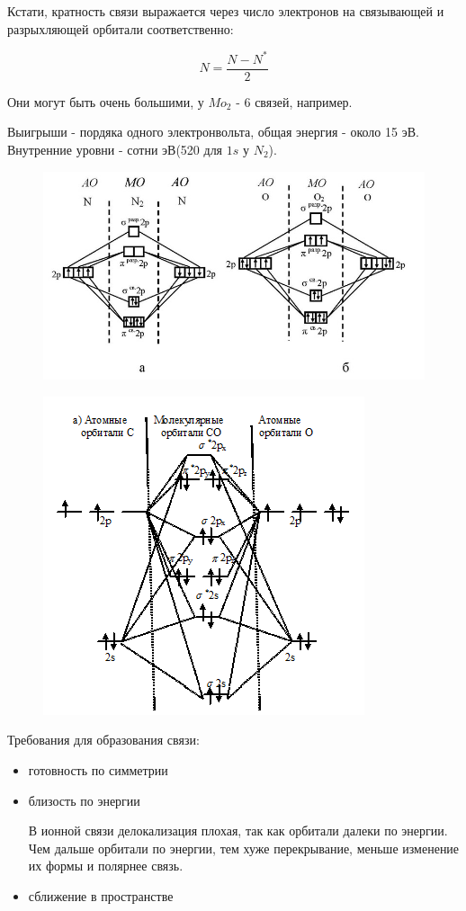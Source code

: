 \documentclass[11pt]{article}
\begin{document}
Кстати, кратность связи выражается через число электронов на связывающей и разрыхляющей орбитали соответственно:

$$N = \frac{N-N^*}2$$

Они могут быть очень большими, у $Mo_2$ - 6 связей, например.

Выигрыши - пордяка одного электронвольта, общая энергия - около 15 эВ. Внутренние уровни - сотни эВ(520 для $1s$ у $N_2$).

\begin{figure}[htp]
\centering
\includegraphics[scale=1.00]{n2o2-mo.jpg}
\end{figure}

\begin{figure}[htp]
\centering
\includegraphics[scale=.500]{co-mo.png}
\caption{}
\label{}
\end{figure}

Требования для образования связи:
\begin{itemize}
\item готовность по симметрии

\item близость по энергии

В ионной связи делокализация плохая, так как орбитали далеки по энергии. Чем дальше орбитали по энергии, тем хуже перекрывание, меньше изменение их формы и полярнее связь.

\item сближение в пространстве
\end{itemize}
\end{document}
